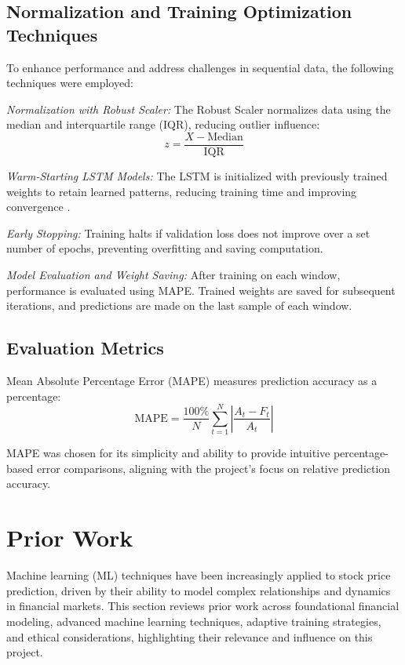 \documentclass[10pt,twocolumn]{article}
\begin{document}
\subsection{Normalization and Training Optimization Techniques}

To enhance performance and address challenges in sequential data, the following techniques were employed:

\textit{Normalization with Robust Scaler:}  
The Robust Scaler normalizes data using the median and interquartile range (IQR), reducing outlier influence\cite{Passalis2021RobustNormalization}:
\[
z = \frac{X - \text{Median}}{\text{IQR}}
\]

\textit{Warm-Starting LSTM Models:}  
The LSTM is initialized with previously trained weights to retain learned patterns, reducing training time and improving convergence \cite{Ash2019WarmStarting}.

\textit{Early Stopping:}  
Training halts if validation loss does not improve over a set number of epochs, preventing overfitting and saving computation.

\textit{Model Evaluation and Weight Saving:}  
After training on each window, performance is evaluated using MAPE. Trained weights are saved for subsequent iterations, and predictions are made on the last sample of each window.

\subsection{Evaluation Metrics}

Mean Absolute Percentage Error (MAPE) measures prediction accuracy as a percentage:
\[
\text{MAPE} = \frac{100\%}{N} \sum_{t=1}^{N} \left| \frac{A_t - F_t}{A_t} \right|
\]

MAPE was chosen for its simplicity and ability to provide intuitive percentage-based error comparisons, aligning with the project’s focus on relative prediction accuracy.

\section{Prior Work}

Machine learning (ML) techniques have been increasingly applied to stock price prediction, driven by their ability to model complex relationships and dynamics in financial markets. This section reviews prior work across foundational financial modeling, advanced machine learning techniques, adaptive training strategies, and ethical considerations, highlighting their relevance and influence on this project.
\end{document}
